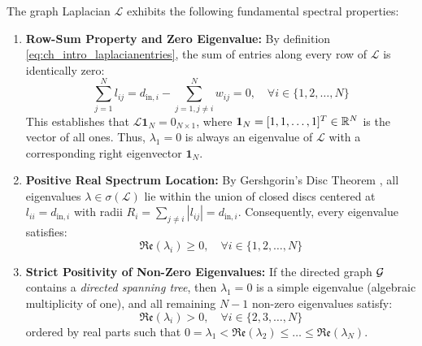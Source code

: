 \begin{remark}\label{prop:ch_intro_laplacianzeroeig}
\leavevmode\par\noindent
The graph Laplacian $\mathcal{L}$ exhibits the following fundamental spectral properties:
\begin{enumerate}
    \item \textbf{Row-Sum Property and Zero Eigenvalue:} By definition \eqref{eq:ch_intro_laplacianentries}, the sum of entries along every row of $\mathcal{L}$ is identically zero:
    \begin{equation}
        \sum_{j=1}^{N} l_{ij} = d_{\text{in}, i} - \sum_{j=1, j \neq i}^{N} w_{ij} = 0, \quad \forall i \in \{1, 2, \dots, N\}
    \end{equation}
    This establishes that $\mathcal{L} \mathbf{1}_N = 0_{N \times 1}$, where $\mathbf{1}_N = [1, 1, \dots, 1]^T \in \mathbb{R}^N$ is the vector of all ones. Thus, $\lambda_1 = 0$ is always an eigenvalue of $\mathcal{L}$ with a corresponding right eigenvector $\mathbf{1}_N$.
    
    \item \textbf{Positive Real Spectrum Location:} By Gershgorin's Disc Theorem \cite{horn2012matrix}, all eigenvalues $\lambda \in \sigma(\mathcal{L})$ lie within the union of closed discs centered at $l_{ii} = d_{\text{in},i}$ with radii $R_i = \sum_{j \neq i} |l_{ij}| = d_{\text{in},i}$. Consequently, every eigenvalue satisfies:
    \begin{equation}
        \mathfrak{Re}(\lambda_i) \ge 0, \quad \forall i \in \{1, 2, \dots, N\}
    \end{equation}
    
    \item \textbf{Strict Positivity of Non-Zero Eigenvalues:} If the directed graph $\mathcal{G}$ contains a \emph{directed spanning tree}, then $\lambda_1 = 0$ is a simple eigenvalue (algebraic multiplicity of one), and all remaining $N-1$ non-zero eigenvalues satisfy:
    \begin{equation}
        \mathfrak{Re}(\lambda_i) > 0, \quad \forall i \in \{2, 3, \dots, N\}
    \end{equation}
    ordered by real parts such that $0 = \lambda_1 < \mathfrak{Re}(\lambda_2) \le \dots \le \mathfrak{Re}(\lambda_N)$.
\end{enumerate}
\end{remark}
